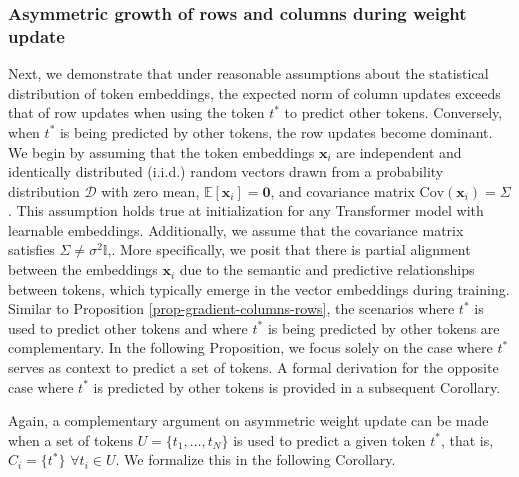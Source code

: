 \subsubsection{Asymmetric growth of rows and columns during weight update}
\label{supp-math-prop-gradient-asymmetric-growth-rows-columns}
%
Next, we demonstrate that under reasonable assumptions about the statistical distribution of token embeddings, the expected norm of column updates exceeds that of row updates when using the token $t^*$ to predict other tokens. 
%
Conversely, when $t^*$ is being predicted by other tokens, the row updates become dominant.
%
We begin by assuming that the token embeddings $\bm{x}_i$ are independent and identically distributed (i.i.d.) random vectors drawn from a probability distribution $\mathcal{D}$ with zero mean, $\mathbb{E}[\bm{x}_i] = \mathbf{0}$, and covariance matrix $\text{Cov}(\bm{x}_i) = \Sigma$.
%
This assumption holds true at initialization for any Transformer model with learnable embeddings. 
%
Additionally, we assume that the covariance matrix satisfies $\Sigma \neq \sigma^2 \mathbb{I}$,.
%
More specifically, we posit that there is partial alignment between the embeddings $\bm{x}_i$ due to the semantic and predictive relationships between tokens, which typically emerge in the vector embeddings during training.
%
Similar to Proposition \ref{prop-gradient-columns-rows}, the scenarios where $t^*$ is used to predict other tokens and where $t^*$ is being predicted by other tokens are complementary. 
%
In the following Proposition, we focus solely on the case where $t^*$ serves as context to predict a set of tokens. 
%
A formal derivation for the opposite case where $t^*$ is predicted by other tokens is provided in a subsequent Corollary.



%

%
Again, a complementary argument on asymmetric weight update can be made when a set of tokens $U = \{t_1, \dots, t_N\}$ is used to predict a given token $t^*$, that is, $C_i = \{t^*\} \,\,\forall t_i \in U$. We formalize this in the following Corollary.
%








%
